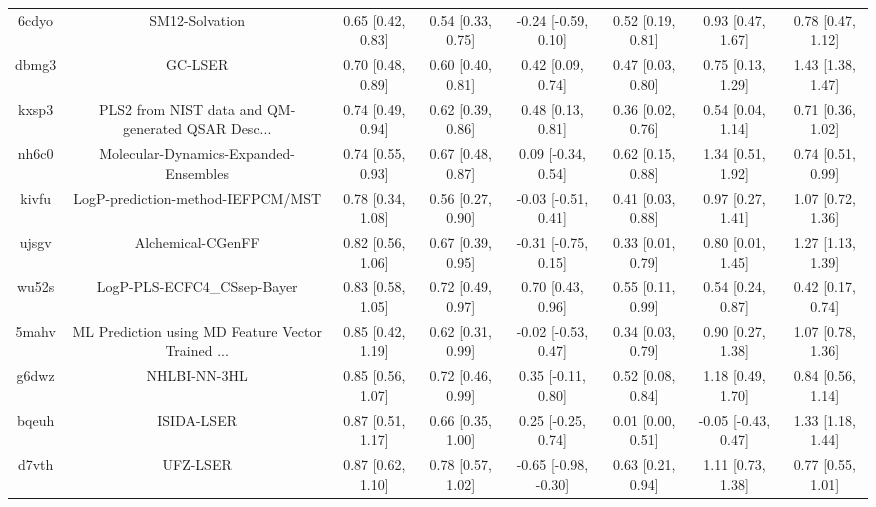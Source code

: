 \documentclass{article}
\begin{document}
\begin{center}
\begin{longtable}{|cccccccc|}
 6cdyo &                                     SM12-Solvation &  0.65 [0.42, 0.83] &  0.54 [0.33, 0.75] &   -0.24 [-0.59, 0.10] &  0.52 [0.19, 0.81] &    0.93 [0.47, 1.67] &     0.78 [0.47, 1.12] \\
 dbmg3 &                                            GC-LSER &  0.70 [0.48, 0.89] &  0.60 [0.40, 0.81] &     0.42 [0.09, 0.74] &  0.47 [0.03, 0.80] &    0.75 [0.13, 1.29] &     1.43 [1.38, 1.47] \\
 kxsp3 &  PLS2 from NIST data and QM-generated QSAR Desc... &  0.74 [0.49, 0.94] &  0.62 [0.39, 0.86] &     0.48 [0.13, 0.81] &  0.36 [0.02, 0.76] &    0.54 [0.04, 1.14] &     0.71 [0.36, 1.02] \\
 nh6c0 &              Molecular-Dynamics-Expanded-Ensembles &  0.74 [0.55, 0.93] &  0.67 [0.48, 0.87] &    0.09 [-0.34, 0.54] &  0.62 [0.15, 0.88] &    1.34 [0.51, 1.92] &     0.74 [0.51, 0.99] \\
 kivfu &                  LogP-prediction-method-IEFPCM/MST &  0.78 [0.34, 1.08] &  0.56 [0.27, 0.90] &   -0.03 [-0.51, 0.41] &  0.41 [0.03, 0.88] &    0.97 [0.27, 1.41] &     1.07 [0.72, 1.36] \\
 ujsgv &                                  Alchemical-CGenFF &  0.82 [0.56, 1.06] &  0.67 [0.39, 0.95] &   -0.31 [-0.75, 0.15] &  0.33 [0.01, 0.79] &    0.80 [0.01, 1.45] &     1.27 [1.13, 1.39] \\
 wu52s &                        LogP-PLS-ECFC4\_CSsep-Bayer &  0.83 [0.58, 1.05] &  0.72 [0.49, 0.97] &     0.70 [0.43, 0.96] &  0.55 [0.11, 0.99] &    0.54 [0.24, 0.87] &     0.42 [0.17, 0.74] \\
 5mahv &  ML Prediction using MD Feature Vector Trained ... &  0.85 [0.42, 1.19] &  0.62 [0.31, 0.99] &   -0.02 [-0.53, 0.47] &  0.34 [0.03, 0.79] &    0.90 [0.27, 1.38] &     1.07 [0.78, 1.36] \\
 g6dwz &                                       NHLBI-NN-3HL &  0.85 [0.56, 1.07] &  0.72 [0.46, 0.99] &    0.35 [-0.11, 0.80] &  0.52 [0.08, 0.84] &    1.18 [0.49, 1.70] &     0.84 [0.56, 1.14] \\
 bqeuh &                                         ISIDA-LSER &  0.87 [0.51, 1.17] &  0.66 [0.35, 1.00] &    0.25 [-0.25, 0.74] &  0.01 [0.00, 0.51] &  -0.05 [-0.43, 0.47] &     1.33 [1.18, 1.44] \\
 d7vth &                                           UFZ-LSER &  0.87 [0.62, 1.10] &  0.78 [0.57, 1.02] &  -0.65 [-0.98, -0.30] &  0.63 [0.21, 0.94] &    1.11 [0.73, 1.38] &     0.77 [0.55, 1.01] \\

\end{longtable}
\end{center}
\end{document}
